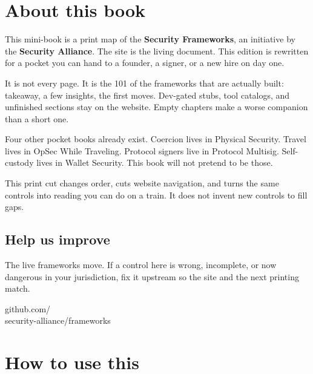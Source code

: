 \chapter{About this book}

This mini-book is a print map of the
\textbf{Security Frameworks}, an initiative by the
\textbf{Security Alliance}. The site is the living
document. This edition is rewritten for a pocket you can
hand to a founder, a signer, or a new hire on day one.

It is not every page. It is the 101 of the frameworks
that are actually built: takeaway, a few insights, the
first moves. Dev-gated stubs, tool catalogs, and
unfinished sections stay on the website. Empty chapters
make a worse companion than a short one.

Four other pocket books already exist. Coercion lives in
Physical Security. Travel lives in OpSec While Traveling.
Protocol signers live in Protocol Multisig. Self-custody
lives in Wallet Security. This book will not pretend to
be those.

This print cut changes order, cuts website navigation,
and turns the same controls into reading you can do on a
train. It does not invent new controls to fill gaps.

\section{Help us improve}

The live frameworks move. If a control here is wrong,
incomplete, or now dangerous in your jurisdiction, fix it
upstream so the site and the next printing match.

{\ttfamily github.com/\\security-alliance/frameworks}



\chapter{How to use this}

